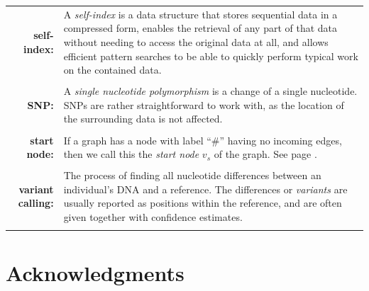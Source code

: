 \documentclass[a4paper,12pt,twoside,BCOR=10mm]{scrbook}
\begin{document}
\begin{tabular}{r p{12.2cm}}
\textbf{self-index:} &
A \textit{self-index} is a data structure that
stores sequential data in a compressed form, enables the retrieval of any part of that data without needing
to access the original data at all,
and allows efficient pattern searches to be able to quickly perform typical work on the contained data.
\\ \\

\textbf{SNP:} &
A \textit{single nucleotide polymorphism} is a change of a single nucleotide.
SNPs are rather straightforward to work with, as the location of the surrounding data is not affected.
\\ \\

\textbf{start node:} & If a graph has a node with label “$\#$”
having no incoming edges, then we call this the \textit{start node} $ v_s $ of the graph.
See page \pageref{def:start_node}.
\\ \\

\textbf{variant calling:} &
The process of finding all nucleotide differences
between an individual's DNA and a reference. The differences or \textit{variants} are usually reported as positions
within the reference, and are often given together with confidence estimates.
\\ \\

\end{tabular}

\chapter*{Acknowledgments}

\end{document}
